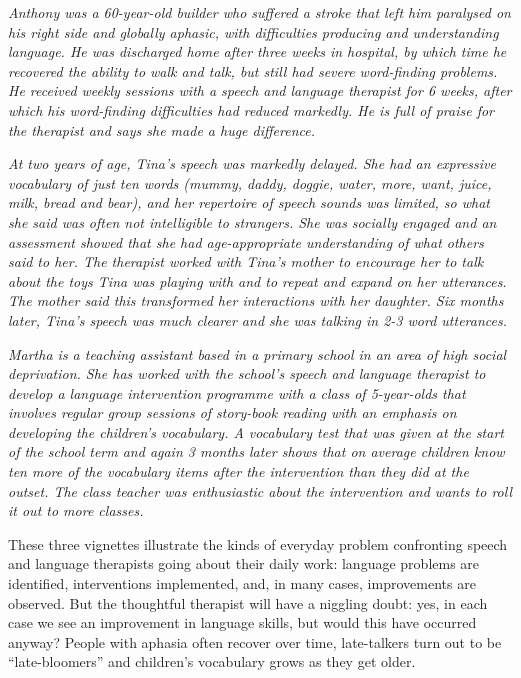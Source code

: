 \documentclass{krantz}
\begin{document}
\begin{shaded}
\textit{Anthony was a 60-year-old builder who suffered a stroke that left him paralysed on his right side and globally aphasic, with difficulties producing and understanding language. He was discharged home after three weeks in hospital, by which time he recovered the ability to walk and talk, but still had severe word-finding problems. He received weekly sessions with a speech and language therapist for 6 weeks, after which his word-finding difficulties had reduced markedly. He is full of praise for the therapist and says she made a huge difference.}
\end{shaded}
\begin{shaded}
\textit{At two years of age, Tina's speech was markedly delayed. She had an expressive vocabulary of just ten words (mummy, daddy, doggie, water, more, want, juice, milk, bread and bear), and her repertoire of speech sounds was limited, so what she said was often not intelligible to strangers. She was socially engaged and an assessment showed that she had age-appropriate understanding of what others said to her. The therapist worked with Tina's mother to encourage her to talk about the toys Tina was playing with and to repeat and expand on her utterances. The mother said this transformed her interactions with her daughter. Six months later, Tina's speech was much clearer and she was talking in 2-3 word utterances.}
\end{shaded}
\begin{shaded}
\textit{Martha is a teaching assistant based in a primary school in an area of high social deprivation. She has worked with the school's speech and language therapist to develop a language intervention programme with a class of 5-year-olds that involves regular group sessions of story-book reading with an emphasis on developing the children's vocabulary. A vocabulary test that was given at the start of the school term and again 3 months later shows that on average children know ten more of the vocabulary items after the intervention than they did at the outset. The class teacher was enthusiastic about the intervention and wants to roll it out to more classes.}
\end{shaded}

These three vignettes illustrate the kinds of everyday problem confronting speech and language therapists going about their daily work: language problems are identified, interventions implemented, and, in many cases, improvements are observed. But the thoughtful therapist will have a niggling doubt: yes, in each case we see an improvement in language skills, but would this have occurred anyway? People with aphasia often recover over time, late-talkers turn out to be ``late-bloomers'' and children's vocabulary grows as they get older.
\end{document}
